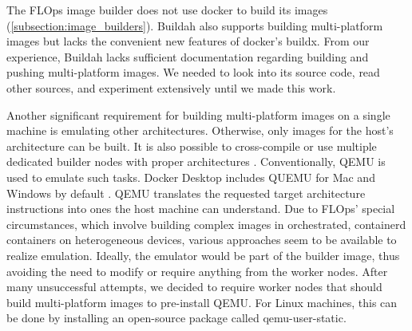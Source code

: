 The FLOps image builder does not use docker to build its images (\ref{subsection:image_builders}).
Buildah also supports building multi-platform images but lacks the convenient new features of docker's buildx.
From our experience, Buildah lacks sufficient documentation regarding building and pushing multi-platform images.
We needed to look into its source code, read other sources, and experiment extensively until we made this work.

Another significant requirement for building multi-platform images on a single machine is emulating other architectures.
Otherwise, only images for the host's architecture can be built.
It is also possible to cross-compile or use multiple dedicated builder nodes with proper architectures \cite{docs:docker_multiplatform_image_builds}.
Conventionally, QEMU \cite{docs:quemu} is used to emulate such tasks.
Docker Desktop includes QUEMU for Mac and Windows by default \cite{docs:docker_multiplatform_image_builds}.
QEMU translates the requested target architecture instructions into ones the host machine can understand.
Due to FLOps' special circumstances, which involve building complex images in orchestrated, containerd containers on heterogeneous devices, various approaches seem to be available to realize emulation.
Ideally, the emulator would be part of the builder image, thus avoiding the need to modify or require anything from the worker nodes.
After many unsuccessful attempts, we decided to require worker nodes that should build multi-platform images to pre-install QEMU.
For Linux machines, this can be done by installing an open-source package called qemu-user-static.

